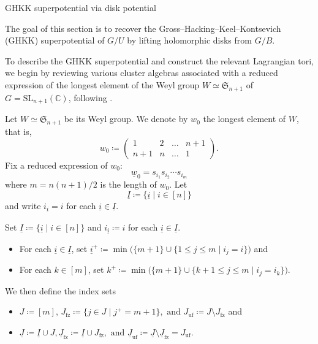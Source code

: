 \documentclass[11pt]{amsart}
\makeatletter
\def\section{\@startsection{section}{1}%
  \z@{-1.2\linespacing\@plus-.5\linespacing}{.8\linespacing}%
  {\normalfont\bfseries\large}}
\theoremstyle{plain}
\theoremstyle{definition}
\theoremstyle{remark}
\newcommand{\C}{\mathbb{C}}
\numberwithin{equation}{section} \numberwithin{table}{section}
\numberwithin{equation}{section}
\makeatother
\begin{document}
\section{GHKK superpotential via disk potential}\label{sec_GHKKstring}

The goal of this section is to recover the Gross--Hacking--Keel--Kontsevich (GHKK) superpotential of $G/U$ by lifting holomorphic disks from $G/B$.

To describe the GHKK superpotential and construct the relevant Lagrangian tori, we begin by reviewing various cluster algebras associated with a reduced expression of the longest element of the Weyl group $W \simeq \mathfrak{S}_{n+1}$ of $G = \mathrm{SL}_{n+1}(\C)$, following \cite{BFZ05, Williams13, GLS11, GY17, FO25}. 

Let $W \simeq \mathfrak{S}_{n+1}$ be its Weyl group. We denote by $w_0$ the longest element of $W$, that is,
$$
w_0 
\coloneqq 
\begin{pmatrix}
1 & 2 & \dots & n+1 \\
n+1 & n & \dots & 1
\end{pmatrix}. 
$$
Fix a reduced expression of $w_0 \colon$
$$
\underline{w}_0 = s_{i_1} s_{i_2} \cdots s_{i_m}
$$
where $m = n(n+1)/2$ is the length of $w_0$. Let
$$
\underline{I} \coloneqq \{ \underline{i} \mid i \in [n] \}
$$
and write $i_{\underline{i}}=i$ for each $\underline{i}\in\underline{I}$.

Set $\underline{I} \coloneqq \{ \underline{i} \mid i \in [n] \}$ and $i_{\underline{i}} \coloneqq i$ for each $\underline{i} \in \underline{I}$.
\begin{itemize}
\item For each $\underline{i} \in \underline{I} $, set $\underline{i}^+ \coloneqq \min \bigl(  \{ m+1 \} \cup \{ 1 \leq j \leq m \mid i_j = i \} \bigr)$ and
\item For each $k \in [m]$, set 
$
k^+ \coloneqq \min \bigl(  \{ m+1 \} \cup \{  k+1 \leq j \leq m \mid i_j = i_k \} \bigr)$. 
\end{itemize}
We then define the index sets
\begin{itemize}
\item $J \coloneqq [m], \, J_\mathrm{fz} \coloneqq \{ j \in J \mid j^+ = m+1 \}, \mbox{ and } J_\mathrm{uf} \coloneqq J \setminus J_\mathrm{fz}$ and
\item $\underline{J} \coloneqq \underline{I} \cup J, \underline{J}_\mathrm{fz} \coloneqq \underline{I} \cup J_\mathrm{fz}, \mbox{ and }  \underline{J}_\mathrm{uf} \coloneqq \underline{J} \setminus \underline{J}_\mathrm{fz} = J_\mathrm{uf}.$
\end{itemize}
\end{document}
